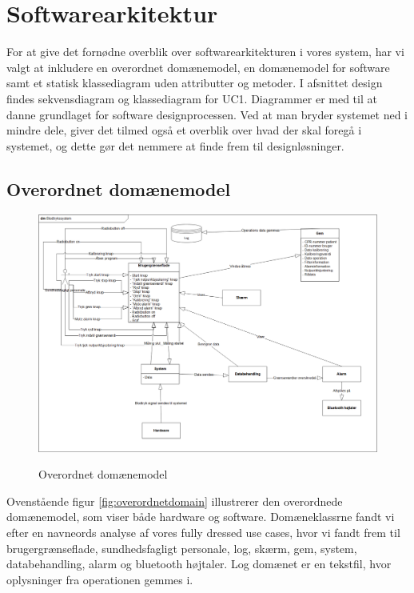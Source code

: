 \section{Softwarearkitektur}
For at give det fornødne overblik over softwarearkitekturen i vores system, har vi valgt at inkludere en overordnet domænemodel, en domænemodel for software samt et statisk klassediagram uden attributter og metoder. I afsnittet design findes sekvensdiagram og klassediagram for UC1. Diagrammer er med til at danne grundlaget for software designprocessen. Ved at man bryder systemet ned i mindre dele, giver det tilmed også et overblik over hvad der skal foregå i systemet, og dette gør det nemmere at finde frem til designløsninger. 

\subsection{Overordnet domænemodel}
	\begin{figure}[h!]
	\centering
	\includegraphics[width=1\linewidth]{Arkitektur_og_design/Softwarearkitektur/overordnetdomain}
	\label{fig:overordnetdomain}
	\caption{Overordnet domænemodel}
\end{figure}

Ovenstående figur \vref{fig:overordnetdomain} illustrerer den overordnede domænemodel, som viser både hardware og software. Domæneklassrne fandt vi efter en navneords analyse af vores fully dressed use cases, hvor vi fandt frem til brugergrænseflade, sundhedsfagligt personale, log, skærm, gem, system, databehandling, alarm og bluetooth højtaler.  Log domænet er en tekstfil, hvor oplysninger fra operationen gemmes i.

